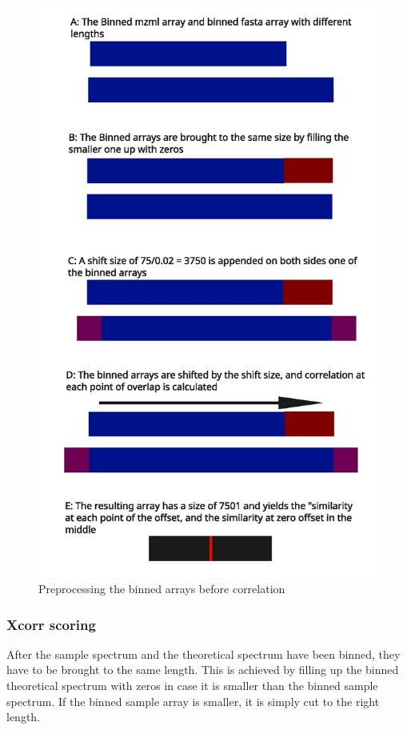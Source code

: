 \documentclass[11pt]{article}
\begin{document}
\begin{figure}
\includegraphics[width=\linewidth]{figs/crosscorr.jpg} 
\caption{Preprocessing the binned arrays before correlation}
\label{fig:corr}
\end{figure}
\subsubsection{Xcorr scoring}
After the sample spectrum and the theoretical spectrum have been binned, they have to be brought to the same length. This is achieved by filling up the binned theoretical spectrum with zeros in case it is smaller than the binned sample spectrum. If the binned sample array is smaller, it is simply cut to the right length. 
\end{document}
